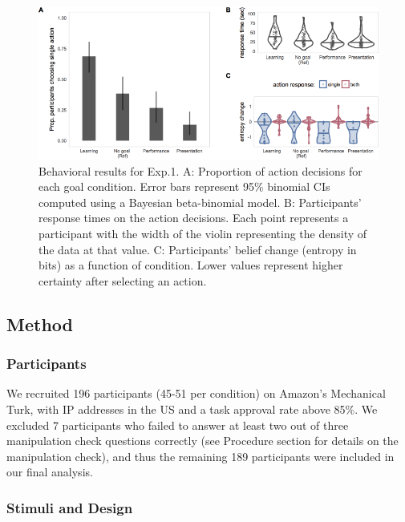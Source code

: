 \documentclass[10pt, letterpaper]{article}
\newenvironment{CodeChunk}{}{}
\begin{document}
\begin{CodeChunk}
\begin{figure}[tb]

{\centering \includegraphics[width=0.95\linewidth]{figs/e1_behav_results_plot-1} 

}

\caption[Behavioral results for Exp.1]{Behavioral results for Exp.1. A: Proportion of action decisions for each goal condition. Error bars represent 95\% binomial CIs computed using a Bayesian beta-binomial model. B: Participants' response times on the action decisions. Each point represents a participant with the width of the violin representing the density of the data at that value. C: Participants' belief change (entropy in bits) as a function of condition. Lower values represent higher certainty after selecting an action.}\label{fig:e1_behav_results_plot}
\end{figure}
\end{CodeChunk}

\subsection{Method}\label{method}

\subsubsection{Participants}\label{participants}

We recruited 196 participants (45-51 per condition) on Amazon's
Mechanical Turk, with IP addresses in the US and a task approval rate
above 85\%. We excluded 7 participants who failed to answer at least two
out of three manipulation check questions correctly (see Procedure
section for details on the manipulation check), and thus the remaining
189 participants were included in our final analysis.

\subsubsection{Stimuli and Design}\label{stimuli-and-design}
\end{document}

